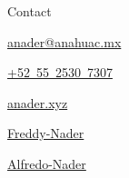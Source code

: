\documentclass{resume} %
\makeatletter
\newcommand{\email}{anader@anahuac.mx}
\newcommand{\tel}{+525525307307}
\newcommand{\telPrint}{+52~55~2530~7307}
\makeatother
\begin{document}

\begin{rSection}{ Contact }

\href{mailto:\email}{\faEnvelope\quad\email}

\href{tel:\tel}{\faPhone\quad\telPrint}

\href{tel:+4915567218118}{\faPhone{}}

\href{https://www.anader.xyz}{\faEarthAmericas\quad\0anader.xyz}

\href{https://github.com/Freddy-Nader}{\faGithub\quad\0Freddy-Nader}

\href{https://www.linkedin.com/in/alfredo-nader/}{\faLinkedin\quad\0Alfredo-Nader}

\end{rSection}
\end{document}
